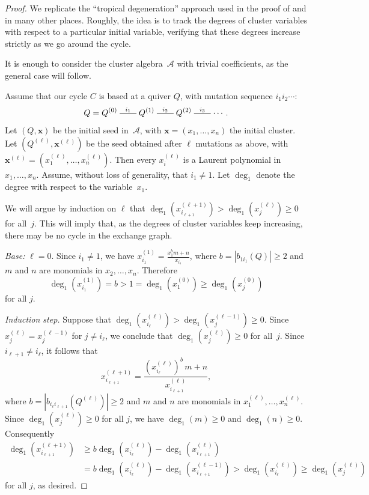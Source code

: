 \documentclass[11pt, letterpaper]{amsart}
\theoremstyle{definition}
\numberwithin{equation}{section}
\def\xx{{\mathbf{x}}}
\newcommand{\mutation}[1]{\stackrel{#1}{\rule[.5ex]{2em}{0.5pt}}}
\begin{document}
\begin{proof}
We replicate the ``tropical degeneration'' approach used in the proof of \cite[Theorem~5.1.1]{FWZ} and in many other places. 
Roughly, the idea is to track the degrees of cluster variables with respect to a particular initial variable, 
verifying that these degrees increase strictly as we go around the cycle. 

It is enough to consider the cluster algebra~$\mathcal{A}$ with trivial coefficients, as the general case will follow. 

Assume that our cycle $C$ is based at a quiver $Q$, with mutation sequence $i_1 i_2\cdots$: 
\begin{equation*}
Q=Q^{(0)} \mutation{i_1}
Q^{(1)} \mutation{i_2}
Q^{(2)} \mutation{i_3}
\cdots
.
\end{equation*}
Let $(Q,\xx)$ be the initial seed in~$\mathcal{A}$, with $\xx\!=\!(x_1,\dots,x_n)$ the initial cluster.
Let $(Q^{(\ell)},\xx^{(\ell)})$ be the seed obtained after $\ell$ mutations as above, with $\xx^{(\ell)}=(x^{(\ell)}_1,\dots,x^{(\ell)}_n)$. 
Then every $x^{(\ell)}_i$ is a Laurent polynomial in $x_1,\dots,x_n$. 
Assume, without loss of generality, that $i_1 \neq 1$. 
Let $\deg_1$ denote the degree with respect to the variable~$x_1$. 

We will argue by induction on $\ell$ that $\deg_1(x_{i_{\ell+1}}^{(\ell +1)}) > \deg_1(x_j^{(\ell)}) \geq 0$ for all~$j$.
This will imply that, as the degrees of cluster variables keep increasing, there may be no cycle in the exchange graph.

\emph{Base:} $\ell = 0$.
Since $i_1 \neq 1$, we have 
$x_{i_1}^{(1)} = \frac{ x_1^{b}m  + n}{ x_{i_1}}$, 
where $b=|b_{1i_1}(Q)|\ge 2$ 
and $m$ and $n$ are monomials in $x_2, \ldots, x_n$. 
Therefore 
\begin{equation*}
\deg_1(x_{i_1}^{(1)}) = b > 1 = \deg_1(x_1^{(0)}) \geq \deg_1(x_j^{(0)})
\end{equation*}
for all $j$.

\emph{Induction step.} 
Suppose that $\deg_1(x_{i_{\ell}}^{(\ell)}) > \deg_1(x_j^{(\ell-1)}) \geq 0$. 
Since $x_{j}^{(\ell)} = x_j^{(\ell-1)}$ for $j \neq i_{\ell}$, we conclude that $\deg_1(x_j^{(\ell)}) \geq 0$ for all~$j$.
Since $i_{\ell+1} \neq i_{\ell}$, it follows that 
\begin{equation*}
x_{i_{\ell+1}}^{(\ell+1)} = \frac{ (x_{i_{\ell}}^{(\ell)})^b\,m  + n}{ x_{i_{\ell+1}}^{(\ell)}},
\end{equation*}
where $b=|b_{i_{\ell}i_{\ell+1}}(Q^{(\ell)})|\ge2$ and $m$ and $n$ are monomials in $x_1^{(\ell)}, \ldots, x_n^{(\ell)}$. 
Since $\deg_1(x_j^{(\ell)}) \geq 0$ for all $j$, we have $\deg_1(m)\ge0$ and $\deg_1(n) \geq 0$.
Consequently  
\begin{align*}
\deg_1(x_{i_{\ell+1}}^{(\ell+1)}) 
&\geq b \deg_1(x_{i_{\ell}}^{(\ell)}) - \deg_1(x_{i_{\ell+1}}^{(\ell)}) \\
&=b \deg_1(x_{i_{\ell}}^{(\ell)}) - \deg_1(x_{i_{\ell+1}}^{(\ell-1)})
> \deg_1(x_{i_{\ell}}^{(\ell)}) 
\geq \deg_1(x_j^{(\ell)})
\end{align*}
for all $j$, as desired.
\end{proof}
\end{document}
